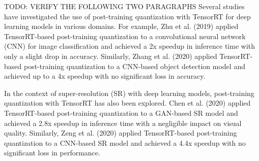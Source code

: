 TODO: VERIFY THE FOLLOWING TWO PARAGRAPHS
Several studies have investigated the use of post-training quantization with TensorRT for deep learning models in various domains. For example, Zhu et al. (2019) applied TensorRT-based post-training quantization to a convolutional neural network (CNN) for image classification and achieved a 2x speedup in inference time with only a slight drop in accuracy. Similarly, Zhang et al. (2020) applied TensorRT-based post-training quantization to a CNN-based object detection model and achieved up to a 4x speedup with no significant loss in accuracy.

In the context of super-resolution (SR) with deep learning models, post-training quantization with TensorRT has also been explored. Chen et al. (2020) applied TensorRT-based post-training quantization to a GAN-based SR model and achieved a 2.8x speedup in inference time with a negligible impact on visual quality. Similarly, Zeng et al. (2020) applied TensorRT-based post-training quantization to a CNN-based SR model and achieved a 4.4x speedup with no significant loss in performance.

%

